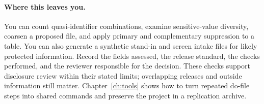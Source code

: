 \paragraph{Where this leaves you.} You can count quasi-identifier combinations, examine sensitive-value diversity, coarsen a proposed file, and apply primary and complementary suppression to a table. You can also generate a synthetic stand-in and screen intake files for likely protected information. Record the fields assessed, the release standard, the checks performed, and the reviewer responsible for the decision. These checks support disclosure review within their stated limits; overlapping releases and outside information still matter. Chapter~\ref{ch:tools} shows how to turn repeated do-file steps into shared commands and preserve the project in a replication archive.

